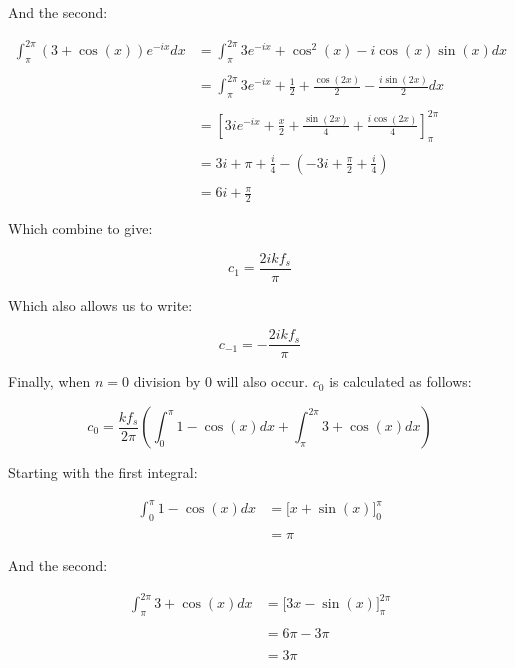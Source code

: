 \begin{appendices}
		And the second:
		
		\begin{align}
			\int_{\pi}^{2\pi} (3+\cos(x))e^{-ix} dx & = 
				\int_{\pi}^{2\pi} 3e^{-ix} + \cos^{2}(x) - i\cos(x)\sin(x) dx \nonumber \\
			\nonumber \\
			& = \int_{\pi}^{2\pi} 3e^{-ix} + \frac{1}{2} + \frac{\cos(2x)}{2} - 
				\frac{i\sin(2x)}{2} dx \nonumber \\
			\nonumber \\
			& = \left[ 3ie^{-ix} + \frac{x}{2} + \frac{\sin(2x)}{4} + 
				\frac{i\cos(2x)}{4} \right]_{\pi}^{2\pi} \nonumber \\
			\nonumber \\
			& = 3i + \pi + \frac{i}{4} - \left( -3i + \frac{\pi}{2} + \frac{i}{4} \right) \nonumber \\
			\nonumber \\
			& = 6i + \frac{\pi}{2} \nonumber
		\end{align}

		Which combine to give:

		\[ c_{1} = \frac{2ikf_{s}}{\pi} \]

		Which also allows us to write:

		\[ c_{-1} = -\frac{2ikf_{s}}{\pi} \]

		Finally, when $n = 0$ division by 0 will also occur. $c_{0}$ is calculated as follows:

		\[ c_{0} = \frac{kf_{s}}{2\pi} \left( \int_{0}^{\pi} 1-\cos(x) dx
						      + \int_{\pi}^{2\pi} 3 + \cos(x) dx 
						      \right) \]

		Starting with the first integral:

		\begin{align}
			\int_{0}^{\pi} 1 - \cos(x) dx & = \biggl[ x + \sin(x) \biggr]_{0}^{\pi} \nonumber \\
			\nonumber \\
			& = \pi \nonumber
		\end{align}

		And the second:

		\begin{align}
			\int_{\pi}^{2\pi} 3 + \cos(x) dx & = \biggl[ 3x - \sin(x) \biggr]_{\pi}^{2\pi} \nonumber \\
			\nonumber \\
			& = 6\pi - 3\pi \nonumber \\
			\nonumber \\
			& = 3\pi \nonumber
		\end{align}


\end{appendices}
